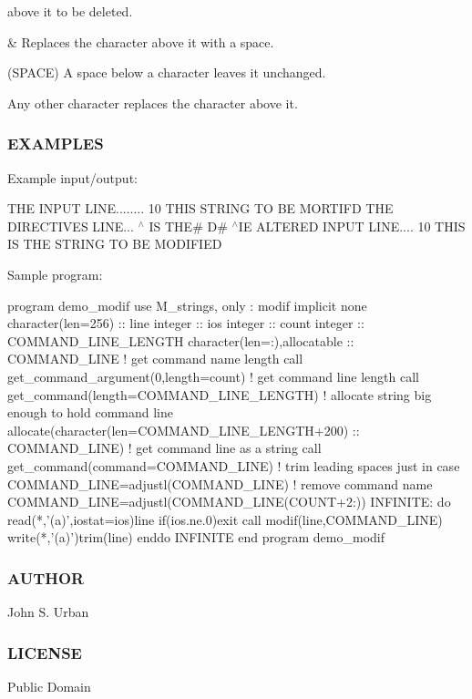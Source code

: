above it to be deleted.

\& Replaces the character above it with a space.

(S\+P\+A\+CE) A space below a character leaves it unchanged.

Any other character replaces the character above it.

\subsubsection*{E\+X\+A\+M\+P\+L\+ES}

Example input/output\+:

T\+HE I\+N\+P\+UT L\+I\+NE........ 10 T\+H\+IS S\+T\+R\+I\+NG TO BE M\+O\+R\+T\+I\+FD T\+HE D\+I\+R\+E\+C\+T\+I\+V\+ES L\+I\+NE... $^\wedge$ IS T\+HE\# D\# $^\wedge$\+IE A\+L\+T\+E\+R\+ED I\+N\+P\+UT L\+I\+NE.... 10 T\+H\+IS IS T\+HE S\+T\+R\+I\+NG TO BE M\+O\+D\+I\+F\+I\+ED

Sample program\+: \begin{DoxyVerb}program demo_modif
use M_strings, only : modif
implicit none
character(len=256)           :: line
integer                      :: ios
integer                      :: count
integer                      :: COMMAND_LINE_LENGTH
character(len=:),allocatable :: COMMAND_LINE
   ! get command name length
   call get_command_argument(0,length=count)
   ! get command line length
   call get_command(length=COMMAND_LINE_LENGTH)
   ! allocate string big enough to hold command line
   allocate(character(len=COMMAND_LINE_LENGTH+200) :: COMMAND_LINE)
   ! get command line as a string
   call get_command(command=COMMAND_LINE)
   ! trim leading spaces just in case
   COMMAND_LINE=adjustl(COMMAND_LINE)
   ! remove command name
   COMMAND_LINE=adjustl(COMMAND_LINE(COUNT+2:))
   INFINITE: do
      read(*,'(a)',iostat=ios)line
      if(ios.ne.0)exit
      call modif(line,COMMAND_LINE)
      write(*,'(a)')trim(line)
   enddo INFINITE
end program demo_modif
\end{DoxyVerb}


\subsubsection*{A\+U\+T\+H\+OR}

John S. Urban \subsubsection*{L\+I\+C\+E\+N\+SE}

Public Domain \mbox{\label{namespacem__strings_a52d27df9dcea52039c6feccb782ec4fd}} 
